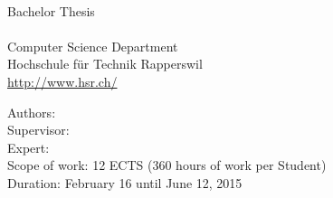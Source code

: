 \begin{titlepage}
\begin{flushleft}
{\huge \bfseries \TITLE}\\[2.5cm]

Bachelor Thesis \\
\SEMESTER \\
Computer Science Department \\
Hochschule für Technik Rapperswil \\
\url{http://www.hsr.ch/}\\[2cm]


\vfill

Authors: \AUTHOR \\
Supervisor: \SUPERVISOR \\
Expert: \EXPERT \\
Scope of work: 12 ECTS (360 hours of work per Student) \\
Duration: February 16 until June 12, 2015 \\

\end{flushleft}
\end{titlepage}
